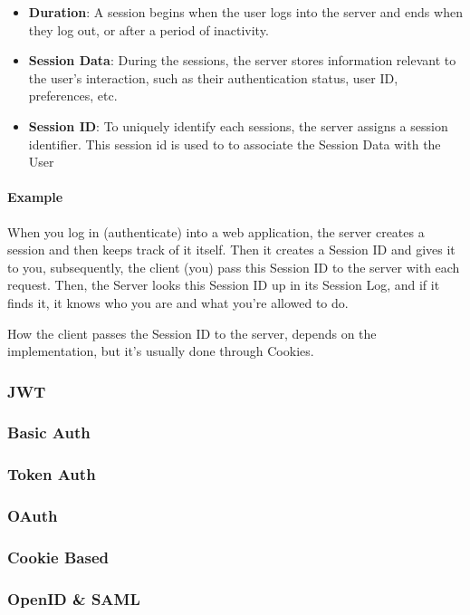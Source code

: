 \documentclass[a4paper]{article}
\begin{document}
    \begin{itemize}
        \item \textbf{Duration}: A session begins when the user logs into the server and ends when they log out, or after a period of inactivity. 
        \item \textbf{Session Data}: During the sessions, the server stores information relevant to the user's interaction, such as their authentication status, user ID, preferences, etc.
        \item \textbf{Session ID}: To uniquely identify each sessions, the server assigns a session identifier. This session id is used to to associate the Session Data with the User
    \end{itemize}

    \paragraph*{Example} When you log in (authenticate) into a web application, the server creates a session and then keeps track of it itself. Then it creates a Session ID and gives it to you, subsequently, the client (you) pass this Session ID to the server with each request. Then, the Server looks this Session ID up in its Session Log, and if it finds it, it knows who you are and what you're allowed to do.

    How the client passes the Session ID to the server, depends on the implementation, but it's usually done through Cookies.


    \subsubsection{JWT}
    \subsubsection{Basic Auth}
    \subsubsection{Token Auth}
    \subsubsection{OAuth}
    \subsubsection{Cookie Based}
    \subsubsection{OpenID \& SAML}
\end{document}
